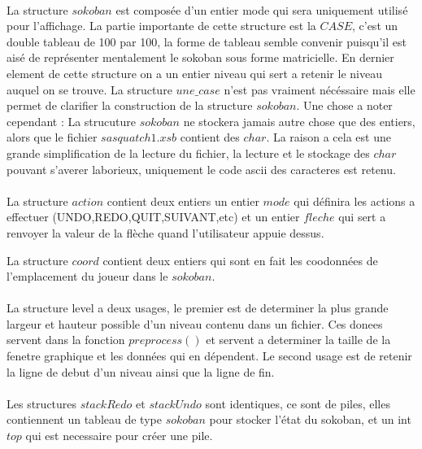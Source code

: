 \documentclass[a4paper]{article}
\begin{document}
  \paragraph{}
  La structure $sokoban$ est composée d'un entier mode qui sera uniquement utilisé pour l'affichage.
  La partie importante de cette structure est la $CASE$, c'est un double tableau de 100 par 100, la forme de tableau semble convenir puisqu'il est aisé de représenter mentalement le sokoban sous forme matricielle.
  En dernier element de cette structure on a un entier niveau qui sert a retenir le niveau auquel on se trouve.
  La structure $une\_case$ n'est pas vraiment nécéssaire mais elle permet de clarifier la construction de la structure $sokoban$.
  Une chose a noter cependant :
  La strucuture $sokoban$ ne stockera jamais autre chose que des entiers, alors que le fichier $sasquatch1.xsb$ contient des $char$.
  La raison a cela est une grande simplification de la lecture du fichier, la lecture et le stockage des $char$ pouvant s'averer laborieux, uniquement le code ascii des caracteres est retenu.

  
  \paragraph{}
  La structure $action$ contient deux entiers un entier $mode$ qui définira les actions a effectuer (UNDO,REDO,QUIT,SUIVANT,etc) et un entier $fleche$ qui sert a renvoyer la valeur de la flèche quand l'utilisateur appuie dessus.

  La structure $coord$ contient deux entiers qui sont en fait les coodonnées de l'emplacement du joueur dans le $sokoban$.
  
  \paragraph{}
  La structure level a deux usages, le premier est de determiner la plus grande largeur et hauteur possible d'un niveau contenu dans un fichier. Ces donees servent dans la fonction $preprocess()$ et servent a determiner la taille de la fenetre graphique et les données qui en dépendent.
  Le second usage est de retenir la ligne de debut d'un niveau ainsi que la ligne de fin.

  
  \paragraph{}
  Les structures $stackRedo$ et $stackUndo$ sont identiques, ce sont de piles, elles contiennent un tableau de type $sokoban$ pour stocker l'état du sokoban, et un int $top$ qui est necessaire pour créer une pile.
\end{document}
